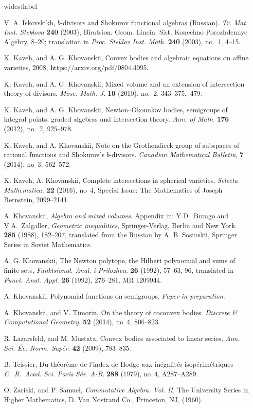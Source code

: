 \documentclass[11pt]{article}
\theoremstyle{plain}
\theoremstyle{definition}
\begin{document}
\begin{thebibliography}{widestlabel}

  V. A. Iskovskikh, $b$-divisors and Shokurov functional algebras (Russian). \emph{Tr. Mat. Inst.
Steklova}  \textbf{240} (2003), Biratsion. Geom. Linein. Sist. Konechno Porozhdennye Algebry, 8--20;
translation in \emph{Proc. Steklov Inst. Math.}  \textbf{240} (2003), no.~1, 4--15.

  K. Kaveh, and A. G. Khovanskii, Convex bodies and algebraic equations
on affine varieties, 2008,  	 https://arxiv.org/pdf/0804.4095.

  K. Kaveh, and A. G. Khovanskii, Mixed volume and an extension of intersection theory of divisors.
 \emph{Mosc. Math. J.}  \textbf{10} (2010), no.~2, 343--375,~479.

  K. Kaveh, and A. G. Khovanskii, Newton--Okounkov bodies, semigroups of integral points, graded algebras and intersection theory.  \emph{Ann. of Math.}  \textbf{176} (2012), no.~2, 925--978.

  K. Kaveh, and A. Khovanskii,  Note on the Grothendieck group of subspaces of rational functions and Shokurov's $b$-divisors.  \emph{Canadian Mathematical Bulletin},  \textbf{7} (2014), no~3, 562--572.

  K. Kaveh,  A. Khovanskii,  Complete intersections in spherical varieties.  \emph{Selecta Mathematica.}  \textbf{22} (2016), no~4, Special Issue: The Mathematics of Joseph Bernstein, 2099--2141.

  A. Khovanskii, \emph{Algebra and mixed volumes}. Appendix in:  Y.D.~Burago and V.A.~Zalgaller,  \emph{Geometric inequalities}, Springer-Verlag, Berlin and New York. \textbf{285} (1988), 182--207, translated from
the Russian by A. B. Sosinskii, Springer Series in Soviet Mathematics.


  A. G. Khovanskii, The Newton polytope, the Hilbert polynomial and sums of finite
sets,  \emph{Funktsional. Anal. i Prilozhen}.  \textbf{26} (1992), 57--63, 96, translated in
\emph{Funct. Anal. Appl.}  \textbf{26} (1992), 276--281. MR 1209944.

  A. Khovanskii, Polynomial functions on semigroups, \emph{Paper in preparation}.

  A. Khovanskii, and V. Timorin, On the theory of coconvex bodies.
 \emph{Discrete \& Computational Geometry}.  \textbf{52} (2014), no~4, 806--823.

  R. Lazarsfeld, and M. Mustata, Convex bodies associated to linear
series,  \emph{Ann. Sci.  \'Ec. Norm. Sup\'er.}  \textbf{42} (2009), 783--835.

  B. Teissier,  Du th\'eor\`eme de l'index de Hodge aux in\'egalit\'es
isop\'erim\'etriques   \emph{C.~R.~Acad. Sci. Paris S\'er. A-B}.  \textbf{288} (1979), no~4, A287--A289.

  O. Zariski, and P. Samuel, \emph{Commutative Algebra. Vol. II}, The University
Series in Higher Mathematics, D. Van Nostrand Co., Princeton, NJ, (1960).


\end{thebibliography}
	
\end{document}
